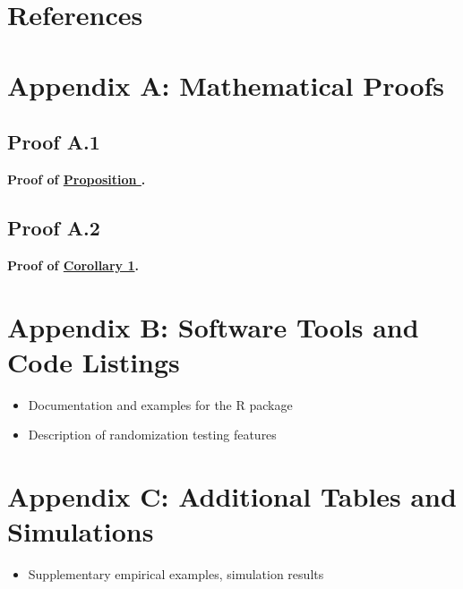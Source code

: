 \documentclass[
  12pt,
]{article}
\providecommand{\tightlist}{%
  \setlength{\itemsep}{0pt}\setlength{\parskip}{0pt}}
\theoremstyle{plain}
\theoremstyle{definition}
\theoremstyle{remark}
\begin{document}
\newpage

\section{References}\label{references}

\printbibliography[heading=none]

\newpage

\appendix

\section{Appendix A: Mathematical
Proofs}\label{appendix-a-mathematical-proofs}

\subsection{Proof A.1}\label{proof-max-product}

\textbf{Proof of \hyperref[prop-max-product]{Proposition
\textcite{prop-max-product}}.}

\subsection{Proof A.2}\label{proof-cor-min}

\textbf{Proof of \hyperref[cor-min]{Corollary 1}.}

\section{Appendix B: Software Tools and Code
Listings}\label{appendix-b-software-tools-and-code-listings}

\begin{itemize}
\tightlist
\item
  Documentation and examples for the R package\\
\item
  Description of randomization testing features
\end{itemize}

\section{Appendix C: Additional Tables and
Simulations}\label{appendix-c-additional-tables-and-simulations}

\begin{itemize}
\tightlist
\item
  Supplementary empirical examples, simulation results
\end{itemize}
\end{document}
